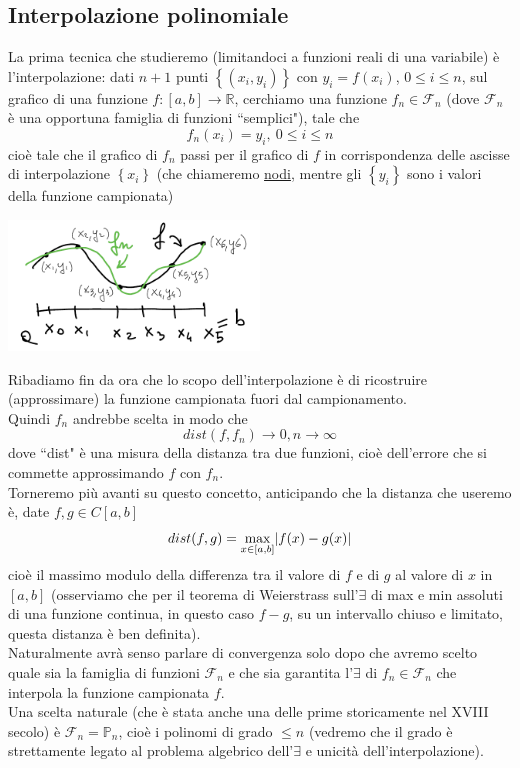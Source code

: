 \subsection{Interpolazione polinomiale}
La prima tecnica che studieremo (limitandoci a funzioni reali di una variabile) è l'interpolazione: dati $n+1$ punti $\left\{ (x_i, y_i) \right\}$ con $y_i=f(x_i)$, $0 \leq i \leq n$, sul grafico di una funzione $f:[a,b] \rightarrow \mathbb{R}$, cerchiamo una funzione $f_n \in \mathcal{F}_n$ (dove $\mathcal{F}_n$ è una opportuna famiglia di funzioni ``semplici"), tale che
\[ f_n(x_i) = y_i, \ 0 \le i \le n \]
cioè tale che il grafico di $f_n$ passi per il grafico di $f$ in corrispondenza delle ascisse di interpolazione $\left\{ x_i \right\}$ (che chiameremo \uline{nodi}, mentre gli $\left\{ y_i \right\}$ sono i valori della funzione campionata)
\begin{center}
    \includegraphics[width=0.5\textwidth]{foto/lez12_img1}
\end{center}
Ribadiamo fin da ora che lo scopo dell'interpolazione è di ricostruire (approssimare) la funzione campionata fuori dal campionamento.\\
Quindi $f_n$ andrebbe scelta in modo che 
\[ dist(f,f_n) \to 0, n \to \infty \]
dove ``dist" è una misura della distanza tra due funzioni, cioè dell'errore che si commette approssimando $f$ con $f_n$. \\
Torneremo più avanti su questo concetto, anticipando che la distanza che useremo è, date $f,g \in C[a,b]$
\[ dist(f,g) = \max_{x \in [a,b]} \lvert f(x) - g(x)\rvert \]
cioè il massimo modulo della differenza tra il valore di $f$ e di $g$ al valore di $x$ in $[a,b]$ (osserviamo che per il teorema di Weierstrass sull'$\exists$ di max e min assoluti di una funzione continua, in questo caso $f-g$, su un intervallo chiuso e limitato, questa distanza è ben definita).\\
Naturalmente avrà senso parlare di convergenza solo dopo che avremo scelto quale sia la famiglia di funzioni $\mathcal{F}_n$ e che sia garantita l'$\exists$ di $f_n \in \mathcal{F}_n$ che interpola la funzione campionata $f$. \\
Una scelta naturale (che è stata anche una delle prime storicamente nel XVIII secolo) è $\mathcal{F}_n = \mathbb{P}_n$, cioè i polinomi di grado $\leq n$ (vedremo che il grado è strettamente legato al problema algebrico dell'$\exists$ e unicità dell'interpolazione).\\

